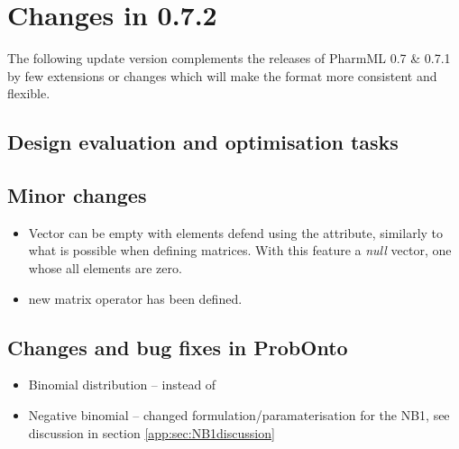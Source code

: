 
\chapter{Changes in 0.7.2}
\label{ch:072changes}
The following update version complements the releases of PharmML 0.7 \& 0.7.1 
by few extensions or changes which will make the format more consistent 
and flexible. 


\section{Design evaluation and optimisation tasks}

\section{Minor changes}
\begin{itemize}
\item 
Vector can be empty with elements defend using the 
attribute, similarly to what is possible when defining matrices. With this
feature a \emph{null} vector, one whose all elements are zero.
\item
new  matrix operator has been defined.
\end{itemize}


\section{Changes and bug fixes in ProbOnto}
\begin{itemize}
\item 
Binomial distribution --  instead of 
\item 
Negative binomial -- changed formulation/paramaterisation for the NB1, 
see discussion in section \ref{app:sec:NB1discussion}
\end{itemize}













